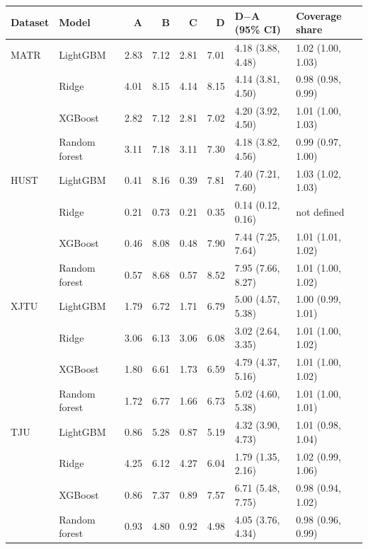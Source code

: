 \begin{tabular}{llrrrrll}
\toprule
Dataset & Model & A & B & C & D & D$-$A (95\% CI) & Coverage share \\
\midrule
MATR & LightGBM & 2.83 & 7.12 & 2.81 & 7.01 & 4.18 (3.88, 4.48) & 1.02 (1.00, 1.03) \\
 & Ridge & 4.01 & 8.15 & 4.14 & 8.15 & 4.14 (3.81, 4.50) & 0.98 (0.98, 0.99) \\
 & XGBoost & 2.82 & 7.12 & 2.81 & 7.02 & 4.20 (3.92, 4.50) & 1.01 (1.00, 1.03) \\
 & Random forest & 3.11 & 7.18 & 3.11 & 7.30 & 4.18 (3.82, 4.56) & 0.99 (0.97, 1.00) \\
HUST & LightGBM & 0.41 & 8.16 & 0.39 & 7.81 & 7.40 (7.21, 7.60) & 1.03 (1.02, 1.03) \\
 & Ridge & 0.21 & 0.73 & 0.21 & 0.35 & 0.14 (0.12, 0.16) & not defined \\
 & XGBoost & 0.46 & 8.08 & 0.48 & 7.90 & 7.44 (7.25, 7.64) & 1.01 (1.01, 1.02) \\
 & Random forest & 0.57 & 8.68 & 0.57 & 8.52 & 7.95 (7.66, 8.27) & 1.01 (1.00, 1.02) \\
XJTU & LightGBM & 1.79 & 6.72 & 1.71 & 6.79 & 5.00 (4.57, 5.38) & 1.00 (0.99, 1.01) \\
 & Ridge & 3.06 & 6.13 & 3.06 & 6.08 & 3.02 (2.64, 3.35) & 1.01 (1.00, 1.02) \\
 & XGBoost & 1.80 & 6.61 & 1.73 & 6.59 & 4.79 (4.37, 5.16) & 1.01 (1.00, 1.02) \\
 & Random forest & 1.72 & 6.77 & 1.66 & 6.73 & 5.02 (4.60, 5.38) & 1.01 (1.00, 1.01) \\
TJU & LightGBM & 0.86 & 5.28 & 0.87 & 5.19 & 4.32 (3.90, 4.73) & 1.01 (0.98, 1.04) \\
 & Ridge & 4.25 & 6.12 & 4.27 & 6.04 & 1.79 (1.35, 2.16) & 1.02 (0.99, 1.06) \\
 & XGBoost & 0.86 & 7.37 & 0.89 & 7.57 & 6.71 (5.48, 7.75) & 0.98 (0.94, 1.02) \\
 & Random forest & 0.93 & 4.80 & 0.92 & 4.98 & 4.05 (3.76, 4.34) & 0.98 (0.96, 0.99) \\
\bottomrule
\end{tabular}
